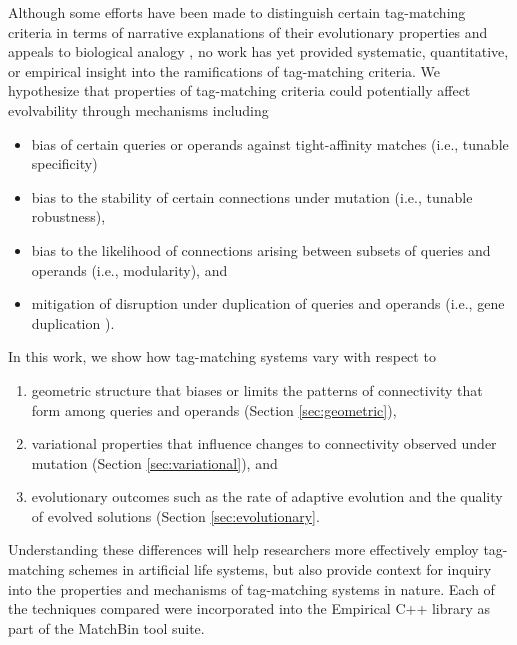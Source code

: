 Although some efforts have been made to distinguish certain tag-matching criteria in terms of narrative explanations of their evolutionary properties and appeals to biological analogy \citep{downing2015intelligence,scherer2004activation}, no work has yet provided systematic, quantitative, or empirical insight into the ramifications of tag-matching criteria.
We hypothesize that properties of tag-matching criteria could potentially affect evolvability through mechanisms including
\begin{itemize}
  \item bias of certain queries or operands against tight-affinity matches (i.e., tunable specificity)
  \item bias to the stability of certain connections under mutation (i.e., tunable robustness),
  \item bias to the likelihood of connections arising between subsets of queries and operands (i.e., modularity), and
  \item mitigation of disruption under duplication of queries and operands (i.e., gene duplication \citep{ohno2013evolution, lewis1978gene}).
\end{itemize}

In this work, we show how tag-matching systems vary with respect to
\begin{enumerate}
  \item geometric structure that biases or limits the patterns of connectivity that form among queries and operands (Section \ref{sec:geometric}),
  \item variational properties that influence changes to connectivity observed under mutation (Section \ref{sec:variational}), and
  \item evolutionary outcomes such as the rate of adaptive evolution and the quality of evolved solutions (Section \ref{sec:evolutionary}.
\end{enumerate}
Understanding these differences will help researchers more effectively employ tag-matching schemes in artificial life systems, but also provide context for inquiry into the properties and mechanisms of tag-matching systems in nature.   
Each of the techniques compared were incorporated into the Empirical C++ library \citep{charles_ofria_2019_2575607} as part of the MatchBin tool suite.



